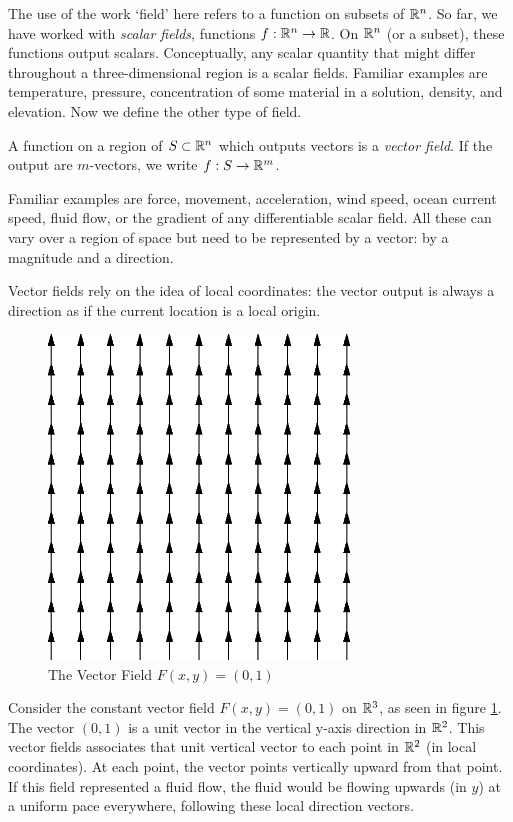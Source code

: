 \documentclass[fleqn,letterpaper]{report}
\begin{document}
The use of the work `field' here refers to a function on
subsets of $\mathbb{R}^n$. So far, we have worked
with \emph{scalar fields}, functions $f: \mathbb{R}^n \rightarrow
\mathbb{R}$. On $\mathbb{R}^n$ (or a subset), these functions output scalars.
Conceptually, any scalar quantity that might differ throughout
a three-dimensional region is a scalar fields. Familiar
examples are temperature, pressure, concentration of some
material in a solution, density, and elevation. Now we define
the other type of field.

\begin{defn}
A function on a region of $S \subset \mathbb{R}^n$ which outputs
vectors is a \emph{vector field}. If the output are
$m$-vectors, we write $f: S \rightarrow \mathbb{R}^m$.
\end{defn}

Familiar examples are force, movement, acceleration, wind
speed, ocean current speed, fluid flow, or the gradient of any
differentiable scalar field. All these can vary over a region
of space but need to be represented by a vector: by a
magnitude and a direction. 

Vector fields rely on the idea of local coordinates: the
vector output is always a direction as if the current location
is a local origin. 

\begin{figure}[t]
\centering
\includegraphics[width=8cm]{figure06.eps}
\caption{The Vector Field $F(x,y) = (0,1)$}
\label{figure-vector-field1}
\end{figure} 

\begin{example}
Consider the constant vector field $F(x,y) = (0,1)$ on
$\mathbb{R}^3$, as seen in figure \ref{figure-vector-field1}. The
vector $(0,1)$ is a unit vector in the vertical y-axis
direction in $\mathbb{R}^2$. This vector fields associates that unit
vertical vector to each point in $\mathbb{R}^2$ (in local
coordinates). At each point, the vector points vertically
upward from that point. If this field represented a fluid
flow, the fluid would be flowing upwards (in $y$) at a
uniform pace everywhere, following these local direction
vectors. 
\end{example}
\end{document}
